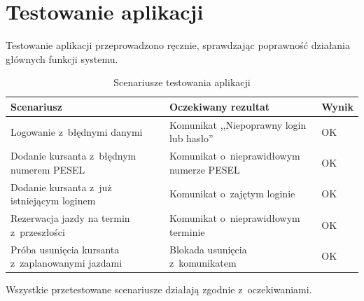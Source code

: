 \chapter{Testowanie aplikacji}
\label{ch:testy}

Testowanie aplikacji przeprowadzono r\k{e}cznie, sprawdzaj\k{a}c poprawno\'{s}\'{c}
dzia\l{}ania g\l{}\'{o}wnych funkcji systemu.

\begin{table}[H]
\centering
\caption{Scenariusze testowania aplikacji}
\label{tab:testy}
\begin{tabularx}{\linewidth}{|X|X|l|}
\hline
\textbf{Scenariusz} & \textbf{Oczekiwany rezultat} & \textbf{Wynik} \\
\hline
Logowanie z~b\l{}\k{e}dnymi danymi & Komunikat ,,Niepoprawny login lub has\l{}o'' & OK \\
\hline
Dodanie kursanta z~b\l{}\k{e}dnym numerem PESEL & Komunikat o~nieprawid\l{}owym numerze PESEL & OK \\
\hline
Dodanie kursanta z~ju\.{z} istniej\k{a}cym loginem & Komunikat o~zaj\k{e}tym loginie & OK \\
\hline
Rezerwacja jazdy na termin z~przesz\l{}o\'{s}ci & Komunikat o~nieprawid\l{}owym terminie & OK \\
\hline
Pr\'{o}ba usuni\k{e}cia kursanta z~zaplanowanymi jazdami & Blokada usuni\k{e}cia z~komunikatem & OK \\
\hline
\end{tabularx}
\end{table}

Wszystkie przetestowane scenariusze dzia\l{}aj\k{a} zgodnie z~oczekiwaniami.
